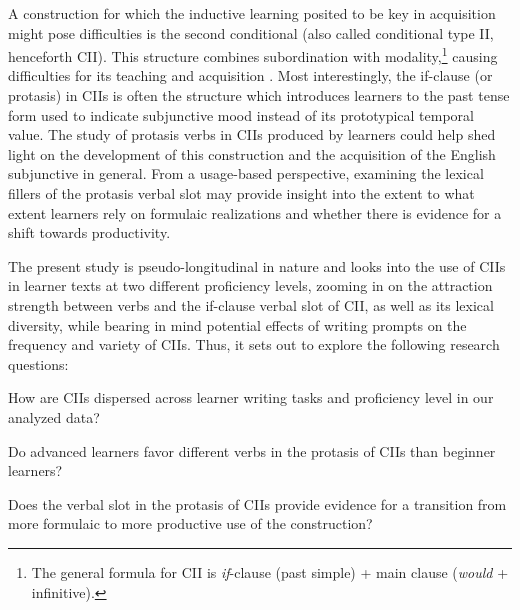 A construction for which the inductive learning posited to be key in acquisition might pose difficulties is the second conditional (also called conditional type II, henceforth CII).
This structure combines subordination with modality,\footnote{The general formula for CII is \textit{if}-clause (past simple) + main clause (\textit{would} + infinitive).} causing difficulties for its teaching and acquisition \citep{kang2007difficult, ko2013study}.
Most interestingly, the if-clause (or protasis) in CIIs is often the structure which introduces learners to the past tense form used to indicate subjunctive mood instead of its prototypical temporal value.
The study of protasis verbs in CIIs produced by learners could help shed light on the development of this construction and the acquisition of the English subjunctive in general.
From a usage-based perspective, examining the lexical fillers of the protasis verbal slot may provide insight into the extent to what extent learners rely on formulaic realizations and whether there is evidence for a shift towards productivity.

The present study is pseudo-longitudinal in nature and looks into the use of CIIs in learner texts at two different proficiency levels, zooming in on the attraction strength between verbs and the if-clause verbal slot of CII, as well as its lexical diversity, while bearing in mind potential effects of writing prompts on the frequency and variety of CIIs.
Thus, it sets out to explore the following research questions:



\begin{questions}
    \item How are CIIs dispersed across learner writing tasks and proficiency level in our analyzed data?\label{rq:disp}
    \item Do advanced learners favor different verbs in the protasis of CIIs than beginner learners?\label{rq:dca}
    \item Does the verbal slot in the protasis of CIIs provide evidence for a transition from more formulaic to more productive use of the construction?\label{rq:lexical_div}
\end{questions}



